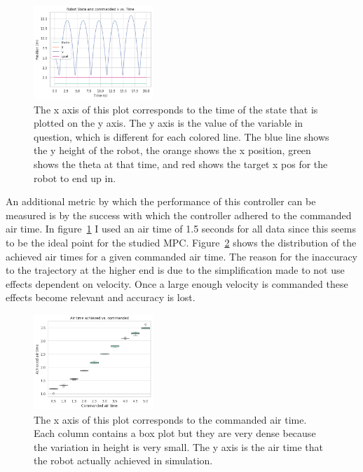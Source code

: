 \documentclass[conference]{IEEEtran}
\begin{document}
\begin{figure}[h!]
    \centering
    \includegraphics[width=0.4\textwidth]{fig2.png}
    \caption{
        The x axis of this plot corresponds to the time of the state that is plotted on the y axis.
        The y axis is the value of the variable in question, which is different for each colored line.
        The blue line shows the y height of the robot, the orange shows the x position, green shows the theta at that time, and red shows the target x pos for the robot to end up in.
    }
    \label{fig:fig2}
\end{figure}

An additional metric by which the performance of this controller can be measured is by the success with which the controller adhered to the commanded air time.
In figure~\ref{fig:fig2} I used an air time of 1.5 seconds for all data since this seems to be the ideal point for the studied MPC.
Figure~\ref{fig:fig3} shows the distribution of the achieved air times for a given commanded air time.
The reason for the inaccuracy to the trajectory at the higher end is due to the simplification made to not use effects dependent on velocity.
Once a large enough velocity is commanded these effects become relevant and accuracy is lost.

\begin{figure}[h!]
    \centering
    \includegraphics[width=0.4\textwidth]{fig3.png}
    \caption{
        The x axis of this plot corresponds to the commanded air time.
        Each column contains a box plot but they are very dense because the variation in height is very small.
        The y axis is the air time that the robot actually achieved in simulation.
    }
    \label{fig:fig3}
\end{figure}
\end{document}
